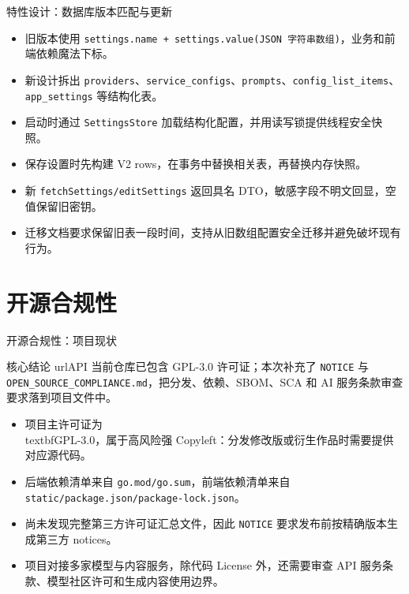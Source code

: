 \documentclass[aspectratio=169,UTF8]{ctexbeamer}
\newcommand{\code}[1]{\texttt{#1}}
\begin{document}
\begin{frame}{特性设计：数据库版本匹配与更新}
  \begin{itemize}
    \item 旧版本使用 \code{settings.name + settings.value(JSON 字符串数组)}，业务和前端依赖魔法下标。
    \item 新设计拆出 \code{providers}、\code{service\_configs}、\code{prompts}、\code{config\_list\_items}、\code{app\_settings} 等结构化表。
    \item 启动时通过 \code{SettingsStore} 加载结构化配置，并用读写锁提供线程安全快照。
    \item 保存设置时先构建 V2 rows，在事务中替换相关表，再替换内存快照。
    \item 新 \code{fetchSettings/editSettings} 返回具名 DTO，敏感字段不明文回显，空值保留旧密钥。
    \item 迁移文档要求保留旧表一段时间，支持从旧数组配置安全迁移并避免破坏现有行为。
  \end{itemize}
\end{frame}

\section{开源合规性}

\begin{frame}{开源合规性：项目现状}
  \begin{block}{核心结论}
    urlAPI 当前仓库已包含 GPL-3.0 许可证；本次补充了 \code{NOTICE} 与 \code{OPEN\_SOURCE\_COMPLIANCE.md}，把分发、依赖、SBOM、SCA 和 AI 服务条款审查要求落到项目文件中。
  \end{block}

  \begin{itemize}
    \item 项目主许可证为 \\textbf{GPL-3.0}，属于高风险强 Copyleft：分发修改版或衍生作品时需要提供对应源代码。
    \item 后端依赖清单来自 \code{go.mod/go.sum}，前端依赖清单来自 \code{static/package.json/package-lock.json}。
    \item 尚未发现完整第三方许可证汇总文件，因此 \code{NOTICE} 要求发布前按精确版本生成第三方 notices。
    \item 项目对接多家模型与内容服务，除代码 License 外，还需要审查 API 服务条款、模型社区许可和生成内容使用边界。
  \end{itemize}
\end{frame}
\end{document}
